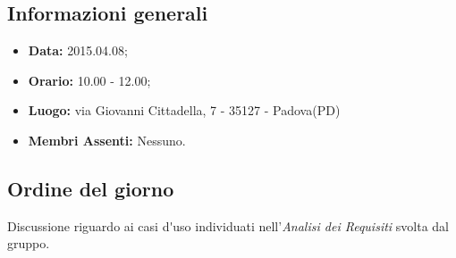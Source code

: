 \subsection{Informazioni generali}
\begin{itemize}
	\item \textbf{Data:} 2015.04.08;
	\item \textbf{Orario:} 10.00 - 12.00;
	\item \textbf{Luogo:} via Giovanni Cittadella, 7 - 35127 - Padova(PD)
	\item \textbf{Membri Assenti:} Nessuno.
\end{itemize}

\subsection{Ordine del giorno}
Discussione riguardo ai \gls{casi d'uso} individuati nell'\textit{Analisi dei Requisiti} svolta dal gruppo.


